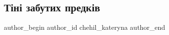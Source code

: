  
 
 
 
 
 
\subsection{Тіні забутих предків}
\label{sec:30_01_2022.fb.chehil_kateryna.1.tini_zabutyh_predkiv}
 
\ifcmt
 author_begin
   author_id chehil_kateryna
 author_end
\fi
